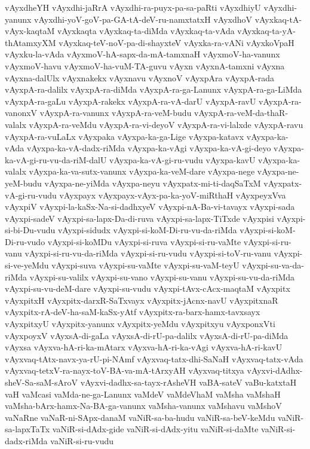 {vAyxdheYH
vAyxdhi-jaRrA
vAyxdhi-ra-puyx-pa-sa-paRti
vAyxdhiyU
vAyxdhi-yanunx
vAyxdhi-yoV-goV-pa-GA-tA-deV-ru-namxtatxH
vAyxdhoV
vAyxkaq-tA-vAyx-kaqtaM
vAyxkaqta
vAyxkaq-ta-diMda
vAyxkaq-ta-vAda
vAyxkaq-ta-yA-thAtamxyXM
vAyxkaq-teV-noV-pa-di-shayxteV
vAyxka-ra-vANi
vAyxkoVpaH
vAyxku-la-vAda
vAyxmoV-hA-sapx-da-mA-tamxnaH
vAyxmoV-ha-vanunx
vAyxmoV-havu
vAyxmoV-ha-vuM-TA-guvu
vAyxn
vAyxnA-tamxni
vAyxna
vAyxna-dalUlx
vAyxnakekx
vAyxnavu
vAyxnoV
vAyxpAra
vAyxpA-rada
vAyxpA-ra-dalilx
vAyxpA-ra-diMda
vAyxpA-ra-ga-Lanunx
vAyxpA-ra-ga-LiMda
vAyxpA-ra-gaLu
vAyxpA-rakekx
vAyxpA-ra-vA-darU
vAyxpA-ravU
vAyxpA-ra-vanonxV
vAyxpA-ra-vanunx
vAyxpA-ra-veM-budu
vAyxpA-ra-veM-da-thaR-valalx
vAyxpA-ra-veMdu
vAyxpA-ra-vi-deyoV
vAyxpA-ra-vi-lalxde
vAyxpA-ravu
vAyxpA-ra-vuLaLx
vAyxpaka
vAyxpa-ka-ga-Lige
vAyxpa-katavx
vAyxpa-ka-vAda
vAyxpa-ka-vA-dadx-riMda
vAyxpa-ka-vAgi
vAyxpa-ka-vA-gi-deyo
vAyxpa-ka-vA-gi-ru-vu-da-riM-dalU
vAyxpa-ka-vA-gi-ru-vudu
vAyxpa-kavU
vAyxpa-ka-valalx
vAyxpa-ka-va-sutx-vanunx
vAyxpa-ka-veM-dare
vAyxpa-nege
vAyxpa-ne-yeM-budu
vAyxpa-ne-yiMda
vAyxpa-neyu
vAyxpatx-mi-ti-daqSaTxM
vAyxpatx-vA-gi-ru-vudu
vAyxpayx
vAyxpayx-vAyx-pa-ka-yoV-miRthaH
vAyxpeyxVva
vAyxpiV
vAyxpi-la-kaSx-Na-si-dadhxyeV
vAyxpi-nA-Ba-vi-tavayx
vAyxpi-sada
vAyxpi-sadeV
vAyxpi-sa-lapx-Da-di-ruva
vAyxpi-sa-lapx-TiTxde
vAyxpisi
vAyxpi-si-bi-Du-vudu
vAyxpi-sidudx
vAyxpi-si-koM-Di-ru-vu-da-riMda
vAyxpi-si-koM-Di-ru-vudo
vAyxpi-si-koMDu
vAyxpi-si-ruva
vAyxpi-si-ru-vaMte
vAyxpi-si-ru-vanu
vAyxpi-si-ru-vu-da-riMda
vAyxpi-si-ru-vudu
vAyxpi-si-toV-ru-vanu
vAyxpi-si-ve-yeMdu
vAyxpi-suva
vAyxpi-su-vaMte
vAyxpi-su-vaM-teyU
vAyxpi-su-va-da-riMda
vAyxpi-su-valilx
vAyxpi-su-vano
vAyxpi-su-vanu
vAyxpi-su-vu-da-riMda
vAyxpi-su-vu-deM-dare
vAyxpi-su-vudu
vAyxpi-tAvx-cAcx-maqtaM
vAyxpitx
vAyxpitxH
vAyxpitx-darxR-SaTxvayx
vAyxpitx-jAcnx-navU
vAyxpitxnaR
vAyxpitx-rA-deV-ha-saM-kaSx-yAtf
vAyxpitx-ra-barx-hamx-tavxsayx
vAyxpitxyU
vAyxpitx-yanunx
vAyxpitx-yeMdu
vAyxpitxyu
vAyxponxVti
vAyxpoyxV
vAyxsA-di-gaLa
vAyxsA-di-rU-pa-dalilx
vAyxsA-di-rU-pa-diMda
vAyxsa
vAyxva-hA-ri-ka-mAtarx
vAyxva-hA-ri-ka-vAgi
vAyxva-hA-ri-kavU
vAyxvaq-tAtx-navx-ya-rU-pi-NAmf
vAyxvaq-tatx-dhi-SaNaH
vAyxvaq-tatx-vAda
vAyxvaq-tetxV-ra-nayx-toV-BA-va-mA-tArxyAH
vAyxvaq-titxya
vAyxvi-dAdhx-sheV-Sa-saM-sAroV
vAyxvi-dadhx-sa-tayx-rAsheVH
vaBA-sateV
vaBu-katxtaH
vaH
vaMcasi
vaMda-ne-ga-Lanunx
vaMdeV
vaMdeVhaM
vaMsha
vaMshaH
vaMsha-bArx-hamx-Na-BA-ga-vanunx
vaMsha-vanunx
vaMshavu
vaMshoV
vaNaRne
vaNaR-ni-SApx-danaM
vaNiR-sa-ba-hudu
vaNiR-sa-beV-keMdu
vaNiR-sa-lapxTaTx
vaNiR-si-dAdx-gide
vaNiR-si-dAdx-yitu
vaNiR-si-daMte
vaNiR-si-dadx-riMda
vaNiR-si-ru-vudu
}
